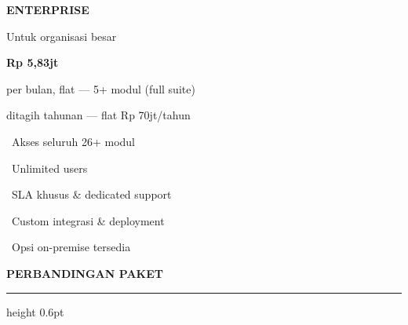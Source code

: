 \documentclass[a4paper]{article}
\newcommand{\sectiontitle}[1]{%
    \vspace{10pt}%
    {\fontsize{13}{16}\selectfont\bfseries\color{BlueDark} #1}\par\vspace{3pt}%
    {\color{BluePrimary}\hrule height 0.6pt}\par\vspace{8pt}%
}
\begin{document}
\begin{minipage}[t]{0.318\textwidth}
    \colorbox{BlueBg}{%
        \begin{minipage}[t][7.6cm][c]{\dimexpr\linewidth-2\fboxsep\relax}
            \begin{center}
                {\fontsize{11}{14}\selectfont\bfseries\color{BlueDark} ENTERPRISE}\par\vspace{2pt}
                {\fontsize{8}{10}\selectfont\color{TextLight} Untuk organisasi besar}\par\vspace{8pt}
                {\fontsize{20}{24}\selectfont\bfseries\color{BluePrimary} Rp 5,83jt}\par\vspace{1pt}
                {\fontsize{8}{10}\selectfont\color{TextLight} per bulan, flat --- 5+ modul (full suite)}\par\vspace{1pt}
                {\fontsize{7.5}{9}\selectfont\color{TextLight} ditagih tahunan --- flat Rp 70jt/tahun}\par\vspace{6pt}
            \end{center}
            {\fontsize{8.5}{12}\selectfont\color{TextDark}%
            \textbullet\ Akses seluruh 26+ modul\par\vspace{2pt}%
            \textbullet\ Unlimited users\par\vspace{2pt}%
            \textbullet\ SLA khusus \& dedicated support\par\vspace{2pt}%
            \textbullet\ Custom integrasi \& deployment\par\vspace{2pt}%
            \textbullet\ Opsi on-premise tersedia}%
        \end{minipage}}
\end{minipage}

\vspace{8pt}

\sectiontitle{PERBANDINGAN PAKET}
\end{document}
